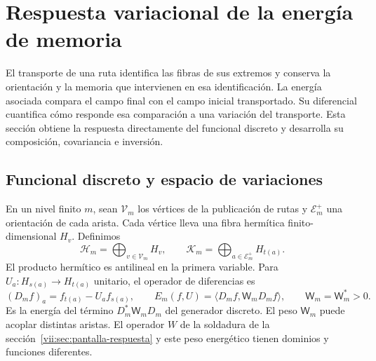 
\section{Respuesta variacional de la energía de memoria}
\label{vii:sec:variacion-memoria}

El transporte de una ruta identifica las fibras de sus extremos y conserva
la orientación y la memoria que intervienen en esa identificación. La energía
asociada compara el campo final con el campo inicial transportado. Su
diferencial cuantifica cómo responde esa comparación a una variación del
transporte. Esta sección obtiene la respuesta directamente del funcional
discreto y desarrolla su composición, covariancia e inversión.

\subsection{Funcional discreto y espacio de variaciones}
\label{vii:subsec:funcional-memoria}

En un nivel finito \(m\), sean \(\mathcal V_m\) los vértices de la
publicación de rutas y \(\mathcal E_m^+\) una orientación de cada arista.
Cada vértice lleva una fibra hermítica finito-dimensional \(H_v\).
Definimos
\[
 \mathcal H_m=\bigoplus_{v\in\mathcal V_m}H_v,\qquad
 \mathcal K_m=\bigoplus_{a\in\mathcal E_m^+}H_{t(a)}.
\]
El producto hermítico es antilineal en la primera variable.
Para \(U_a:H_{s(a)}\to H_{t(a)}\) unitario, el operador de diferencias es
\begin{equation}
 (D_mf)_a=f_{t(a)}-U_af_{s(a)},\qquad
 E_m(f,U)=\langle D_mf,\mathsf W_mD_mf\rangle,\qquad
 \mathsf W_m=\mathsf W_m^*>0.
 \label{vii:eq:energia-memoria-discreta}
\end{equation}
Es la energía del término \(D_m^*\mathsf W_mD_m\) del generador discreto.
El peso \(\mathsf W_m\) puede acoplar distintas aristas. El operador \(W\)
de la soldadura de la sección~\ref{vii:sec:pantalla-respuesta} y este peso
energético tienen dominios y funciones diferentes.

